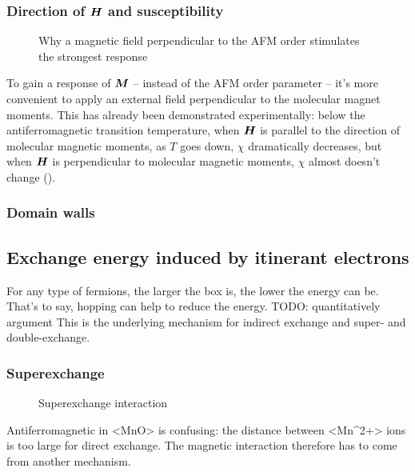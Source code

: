 \documentclass[hyperref, a4paper]{article}
\def\ce#1{<#1>}%
\begin{document}
\subsubsection{Direction of $\vb*{H}$ and susceptibility}

\begin{figure}
    \centering
    
    \caption{Why a magnetic field perpendicular to the AFM order stimulates the strongest response}
    \label{fig:afm-response}
\end{figure}

To gain a response of $\vb*{M}$ -- instead of the AFM order parameter -- 
it's more convenient to apply an external field 
perpendicular to the molecular magnet moments. 
This has already been demonstrated experimentally:
below the antiferromagnetic transition temperature,
when $\vb*{H}$ is parallel to the direction of molecular magnetic moments,
as $T$ goes down, $\chi$ dramatically decreases, 
but when $\vb*{H}$ is perpendicular to molecular magnetic moments, 
$\chi$ almost doesn't change
(). 

\subsubsection{Domain walls}



\subsection{Exchange energy induced by itinerant electrons}

For any type of fermions, 
the larger the box is, 
the lower the energy can be.
That's to say, 
hopping can help to reduce the energy. TODO: quantitatively argument
This is the underlying mechanism for indirect exchange and 
super- and double-exchange.

\subsubsection{Superexchange}

\begin{figure}
    \centering
    
    \caption{Superexchange interaction}
    \label{fig:superexchange}
\end{figure}

Antiferromagnetic in \ce{MnO} is confusing: 
the distance between \ce{Mn^{2+}} ions is too large for direct exchange.
The magnetic interaction therefore has to come from another mechanism.
\end{document}
